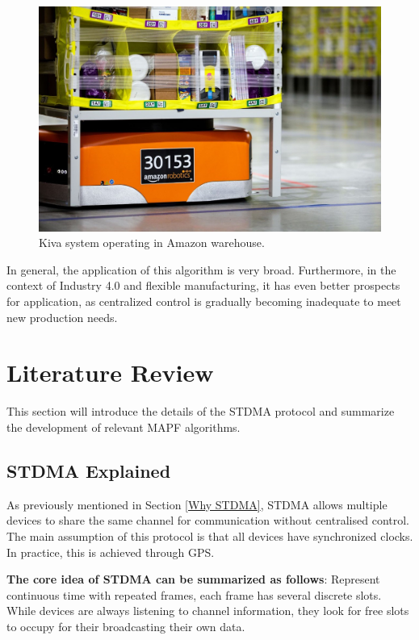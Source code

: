 \documentclass[12pt, oneside]{article}
\begin{document}
\begin{figure}
    \centering
    \includegraphics[width=0.6\linewidth]{Amazon_Warehouse.jpeg}
    \caption{Kiva system operating in Amazon warehouse.\footnotemark[1] }
    \label{fig:Amazon Warehouse Robots}
\end{figure}


    

    In general, the application of this algorithm is very broad. Furthermore, in the context of Industry 4.0 and flexible manufacturing, it has even better prospects for application\cite{Industry_41,Industry_42,Industry_43}, as centralized control is gradually becoming inadequate to meet new production needs.


\section{Literature Review}
\label{LiteratureReview}

This section will introduce the details of the STDMA\cite{STDMA} protocol and summarize the development of relevant MAPF algorithms.
\subsection{STDMA Explained}
\label{STDMA_Explained}


As previously mentioned in Section \ref{Why STDMA}, STDMA\cite{STDMA} allows multiple devices to share the same channel for communication without centralised control. The main assumption of this protocol is that all devices have synchronized clocks. In practice, this is achieved through GPS\cite{STDMA_2}.

\textbf{The core idea of STDMA can be summarized as follows}: Represent continuous time with repeated frames, each frame has several discrete slots. While devices are always listening to channel information, they look for free slots to occupy for their broadcasting their own data.
\end{document}
